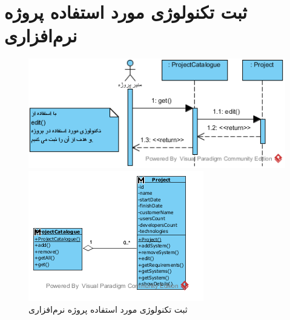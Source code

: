 \section{ثبت تکنولوژی مورد استفاده پروژه نرم‌افزاری}
\begin{figure}[H]
	\centering
	\includegraphics[scale=0.8]{img/sequence-analysis/AddTechnology}
	
	
	\includegraphics[scale=0.8]{img/sequence-analysis/AddTechnologyC}
	\caption{ثبت تکنولوژی مورد استفاده پروژه نرم‌افزاری}
\end{figure}


